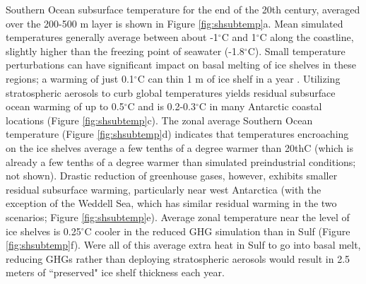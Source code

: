 \documentclass[grl]{AGUTeX}  %
\begin{document}
\begin{article}

Southern Ocean subsurface temperature for the end of the 20th century, averaged over the 200-500 m layer is shown in Figure \ref{fig:shsubtemp}a. Mean simulated temperatures generally average between about -1$^\circ$C and 1$^\circ$C along the coastline, slightly higher than the freezing point of seawater (-1.8$^\circ$C). Small temperature perturbations can have significant impact on basal melting of ice shelves in these regions; a warming of just 0.1$^\circ$C can thin 1 m of ice shelf in a year \citep{rignot02}. Utilizing stratospheric aerosols to curb global temperatures yields residual subsurface ocean warming of up to 0.5$^\circ$C and is 0.2-0.3$^\circ$C in many Antarctic coastal locations (Figure \ref{fig:shsubtemp}c). The zonal average Southern Ocean temperature (Figure \ref{fig:shsubtemp}d) indicates that temperatures encroaching on the ice shelves average a few tenths of a degree warmer than 20thC (which is already a few tenths of a degree warmer than simulated preindustrial conditions; not shown). Drastic reduction of greenhouse gases, however, exhibits smaller residual subsurface warming, particularly near west Antarctica (with the exception of the Weddell Sea, which has similar residual warming in the two scenarios; Figure \ref{fig:shsubtemp}e). Average zonal temperature near the level of ice shelves is 0.25$^\circ$C cooler in the reduced GHG simulation than in Sulf (Figure \ref{fig:shsubtemp}f). Were all of this average extra heat in Sulf to go into basal melt, reducing GHGs rather than deploying stratospheric aerosols would result in 2.5 meters of ``preserved" ice shelf thickness each year. 


\end{article}
\end{document}
